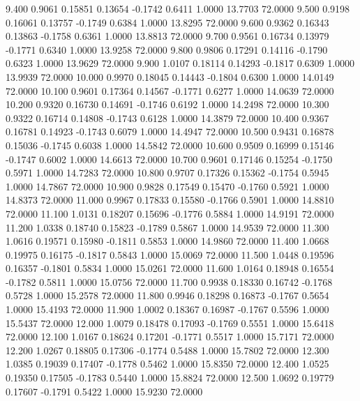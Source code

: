    9.400   0.9061   0.15851   0.13654  -0.1742   0.6411   1.0000  13.7703  72.0000
   9.500   0.9198   0.16061   0.13757  -0.1749   0.6384   1.0000  13.8295  72.0000
   9.600   0.9362   0.16343   0.13863  -0.1758   0.6361   1.0000  13.8813  72.0000
   9.700   0.9561   0.16734   0.13979  -0.1771   0.6340   1.0000  13.9258  72.0000
   9.800   0.9806   0.17291   0.14116  -0.1790   0.6323   1.0000  13.9629  72.0000
   9.900   1.0107   0.18114   0.14293  -0.1817   0.6309   1.0000  13.9939  72.0000
  10.000   0.9970   0.18045   0.14443  -0.1804   0.6300   1.0000  14.0149  72.0000
  10.100   0.9601   0.17364   0.14567  -0.1771   0.6277   1.0000  14.0639  72.0000
  10.200   0.9320   0.16730   0.14691  -0.1746   0.6192   1.0000  14.2498  72.0000
  10.300   0.9322   0.16714   0.14808  -0.1743   0.6128   1.0000  14.3879  72.0000
  10.400   0.9367   0.16781   0.14923  -0.1743   0.6079   1.0000  14.4947  72.0000
  10.500   0.9431   0.16878   0.15036  -0.1745   0.6038   1.0000  14.5842  72.0000
  10.600   0.9509   0.16999   0.15146  -0.1747   0.6002   1.0000  14.6613  72.0000
  10.700   0.9601   0.17146   0.15254  -0.1750   0.5971   1.0000  14.7283  72.0000
  10.800   0.9707   0.17326   0.15362  -0.1754   0.5945   1.0000  14.7867  72.0000
  10.900   0.9828   0.17549   0.15470  -0.1760   0.5921   1.0000  14.8373  72.0000
  11.000   0.9967   0.17833   0.15580  -0.1766   0.5901   1.0000  14.8810  72.0000
  11.100   1.0131   0.18207   0.15696  -0.1776   0.5884   1.0000  14.9191  72.0000
  11.200   1.0338   0.18740   0.15823  -0.1789   0.5867   1.0000  14.9539  72.0000
  11.300   1.0616   0.19571   0.15980  -0.1811   0.5853   1.0000  14.9860  72.0000
  11.400   1.0668   0.19975   0.16175  -0.1817   0.5843   1.0000  15.0069  72.0000
  11.500   1.0448   0.19596   0.16357  -0.1801   0.5834   1.0000  15.0261  72.0000
  11.600   1.0164   0.18948   0.16554  -0.1782   0.5811   1.0000  15.0756  72.0000
  11.700   0.9938   0.18330   0.16742  -0.1768   0.5728   1.0000  15.2578  72.0000
  11.800   0.9946   0.18298   0.16873  -0.1767   0.5654   1.0000  15.4193  72.0000
  11.900   1.0002   0.18367   0.16987  -0.1767   0.5596   1.0000  15.5437  72.0000
  12.000   1.0079   0.18478   0.17093  -0.1769   0.5551   1.0000  15.6418  72.0000
  12.100   1.0167   0.18624   0.17201  -0.1771   0.5517   1.0000  15.7171  72.0000
  12.200   1.0267   0.18805   0.17306  -0.1774   0.5488   1.0000  15.7802  72.0000
  12.300   1.0385   0.19039   0.17407  -0.1778   0.5462   1.0000  15.8350  72.0000
  12.400   1.0525   0.19350   0.17505  -0.1783   0.5440   1.0000  15.8824  72.0000
  12.500   1.0692   0.19779   0.17607  -0.1791   0.5422   1.0000  15.9230  72.0000
